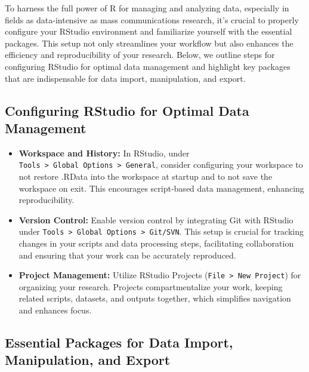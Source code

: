 \documentclass[
]{book}
\begin{document}
To harness the full power of R for managing and analyzing data, especially in fields as data-intensive as mass communications research, it's crucial to properly configure your RStudio environment and familiarize yourself with the essential packages. This setup not only streamlines your workflow but also enhances the efficiency and reproducibility of your research. Below, we outline steps for configuring RStudio for optimal data management and highlight key packages that are indispensable for data import, manipulation, and export.

\hypertarget{configuring-rstudio-for-optimal-data-management}{%
\subsection*{Configuring RStudio for Optimal Data Management}\label{configuring-rstudio-for-optimal-data-management}}

\begin{itemize}
\item
  \textbf{Workspace and History:} In RStudio, under \texttt{Tools\ \textgreater{}\ Global\ Options\ \textgreater{}\ General}, consider configuring your workspace to not restore .RData into the workspace at startup and to not save the workspace on exit. This encourages script-based data management, enhancing reproducibility.
\item
  \textbf{Version Control:} Enable version control by integrating Git with RStudio under \texttt{Tools\ \textgreater{}\ Global\ Options\ \textgreater{}\ Git/SVN}. This setup is crucial for tracking changes in your scripts and data processing steps, facilitating collaboration and ensuring that your work can be accurately reproduced.
\item
  \textbf{Project Management:} Utilize RStudio Projects (\texttt{File\ \textgreater{}\ New\ Project}) for organizing your research. Projects compartmentalize your work, keeping related scripts, datasets, and outputs together, which simplifies navigation and enhances focus.
\end{itemize}

\hypertarget{essential-packages-for-data-import-manipulation-and-export}{%
\subsection*{Essential Packages for Data Import, Manipulation, and Export}\label{essential-packages-for-data-import-manipulation-and-export}}
\end{document}
